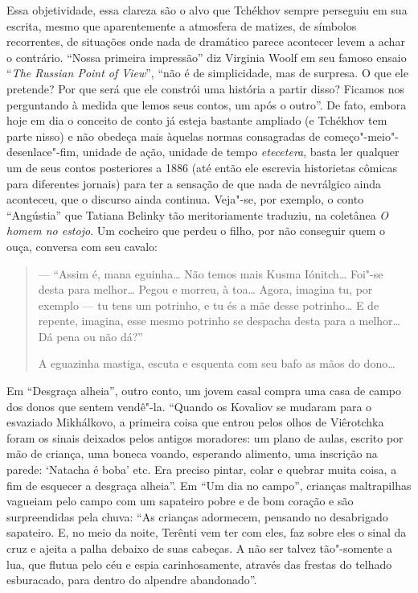 {{Essa objetividade, essa clareza são o alvo que Tchékhov sempre perseguiu
em sua escrita, mesmo que aparentemente a atmosfera de matizes, de
símbolos recorrentes, de situações onde nada de dramático parece
acontecer levem a achar o contrário. ``Nossa primeira impressão'' diz
Virginia Woolf em seu famoso ensaio ``\emph{The Russian Point of
View}'', ``não é de simplicidade, mas de surpresa. O que ele pretende? Por
que será que ele constrói uma história a partir disso? Ficamos nos
perguntando à medida que lemos seus contos, um após o outro''. De fato,
embora hoje em dia o conceito de conto já esteja bastante ampliado (e
Tchékhov tem parte nisso) e não obedeça mais àquelas normas consagradas
de começo"-meio"-desenlace"-fim, unidade de ação, unidade de tempo
\emph{etecetera}, basta ler qualquer um de seus contos posteriores a 1886 (até
então ele escrevia historietas cômicas para diferentes jornais) para ter
a sensação de que nada de nevrálgico ainda aconteceu, que o discurso
ainda continua. Veja"-se, por exemplo, o conto ``Angústia'' que Tatiana
Belinky tão meritoriamente traduziu, na coletânea \emph{O homem no
estojo}. Um cocheiro que perdeu o filho, por não conseguir quem o ouça, conversa com seu cavalo:

\begin{quote}
--- ``Assim é, mana eguinha\ldots{} Não
temos mais Kusma Iónitch\ldots{} Foi"-se desta para melhor\ldots{} Pegou e morreu,
à toa\ldots{} Agora, imagina tu, por exemplo --- tu tens um potrinho, e tu és
a mãe desse potrinho\ldots{} E de repente, imagina, esse mesmo potrinho se
despacha desta para a melhor\ldots{} Dá pena ou não dá?''

A eguazinha mastiga, escuta e esquenta com seu bafo as mãos do dono\ldots{}
\end{quote}


Em ``Desgraça alheia'', outro conto, um jovem casal compra uma casa
de campo dos donos que sentem vendê"-la. ``Quando os Kovaliov se mudaram
para o esvaziado Mikhálkovo, a primeira coisa que entrou pelos olhos de
Viêrotchka foram os sinais deixados pelos antigos moradores: um plano de
aulas, escrito por mão de criança, uma boneca voando, esperando
alimento, uma inscrição na parede: `Natacha é boba' etc. Era preciso pintar, colar e quebrar muita coisa, a fim de esquecer a
desgraça alheia''. Em ``Um dia no campo'', crianças maltrapilhas
vagueiam pelo campo com um sapateiro pobre e de bom coração e são
surpreendidas pela chuva: ``As crianças adormecem, pensando no
desabrigado sapateiro. E, no meio da noite, Terênti vem ter com eles,
faz sobre eles o sinal da cruz e ajeita a palha debaixo de suas cabeças.
A não ser talvez tão"-somente a lua, que flutua pelo céu e espia
carinhosamente, através das frestas do telhado esburacado, para dentro
do alpendre abandonado''.

}}
